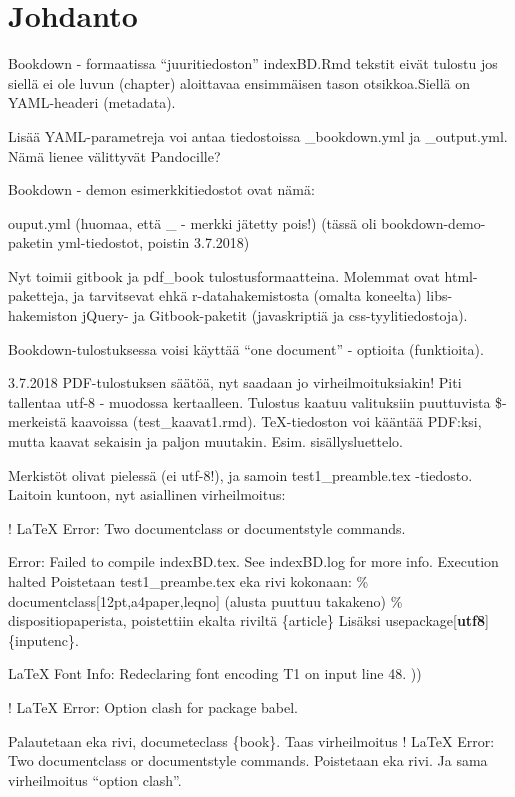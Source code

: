 \documentclass[finnish,]{book}
\theoremstyle{definition}
\theoremstyle{definition}
\theoremstyle{definition}
\theoremstyle{remark}
\begin{document}
\hypertarget{johdanto}{%
\chapter{Johdanto}\label{johdanto}}

Bookdown - formaatissa ``juuritiedoston'' indexBD.Rmd tekstit eivät
tulostu jos siellä ei ole luvun (chapter) aloittavaa ensimmäisen tason
otsikkoa.Siellä on YAML-headeri (metadata).

Lisää YAML-parametreja voi antaa tiedostoissa \_bookdown.yml ja
\_output.yml. Nämä lienee välittyvät Pandocille?

Bookdown - demon esimerkkitiedostot ovat nämä:

ouput.yml (huomaa, että \_ - merkki jätetty pois!) (tässä oli
bookdown-demo-paketin yml-tiedostot, poistin 3.7.2018)

Nyt toimii gitbook ja pdf\_book tulostusformaatteina. Molemmat ovat
html-paketteja, ja tarvitsevat ehkä r-datahakemistosta (omalta koneelta)
libs-hakemiston jQuery- ja Gitbook-paketit (javaskriptiä ja
css-tyylitiedostoja).

Bookdown-tulostuksessa voisi käyttää ``one document'' - optioita
(funktioita).

3.7.2018 PDF-tulostuksen säätöä, nyt saadaan jo virheilmoituksiakin!
Piti tallentaa utf-8 - muodossa kertaalleen. Tulostus kaatuu valituksiin
puuttuvista \$-merkeistä kaavoissa (test\_kaavat1.rmd). TeX-tiedoston
voi kääntää PDF:ksi, mutta kaavat sekaisin ja paljon muutakin. Esim.
sisällysluettelo.

Merkistöt olivat pielessä (ei utf-8!), ja samoin test1\_preamble.tex
-tiedosto. Laitoin kuntoon, nyt asiallinen virheilmoitus:

! LaTeX Error: Two documentclass or documentstyle commands.

Error: Failed to compile indexBD.tex. See indexBD.log for more info.
Execution halted Poistetaan test1\_preambe.tex eka rivi kokonaan: \%
documentclass{[}12pt,a4paper,leqno{]} (alusta puuttuu takakeno) \%
dispositiopaperista, poistettiin ekalta riviltä \{article\} Lisäksi
usepackage{[}\textbf{utf8}{]}\{inputenc\}.

LaTeX Font Info: Redeclaring font encoding T1 on input line 48. ))

! LaTeX Error: Option clash for package babel.

Palautetaan eka rivi, documeteclass \{book\}. Taas virheilmoitus ! LaTeX
Error: Two documentclass or documentstyle commands. Poistetaan eka rivi.
Ja sama virheilmoitus ``option clash''.
\end{document}

